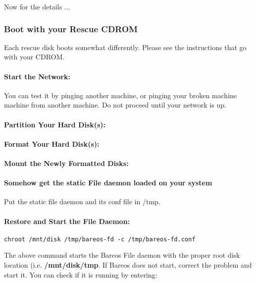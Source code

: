Now for the details ...

\subsubsection{Boot with your Rescue CDROM}

Each rescue disk boots somewhat differently.  Please see the
instructions that go with your CDROM.


\paragraph*{Start the Network:}

\normalsize

You can test it by pinging another machine, or pinging your broken machine
machine from another machine. Do not proceed until your network is up.

\paragraph*{Partition Your Hard Disk(s):}

\paragraph*{Format Your Hard Disk(s):}

\paragraph*{Mount the Newly Formatted Disks:}


\paragraph*{Somehow get the static File daemon loaded on your system}
Put the static file daemon and its conf file in /tmp.

\paragraph*{Restore and Start the File Daemon:}
\footnotesize
\begin{verbatim}
chroot /mnt/disk /tmp/bareos-fd -c /tmp/bareos-fd.conf
\end{verbatim}
\normalsize

The above command starts the Bareos File daemon with the proper root disk
location (i.e. {\bf /mnt/disk/tmp}. If Bareos does not start, correct the
problem and start it. You can check if it is running by entering:

